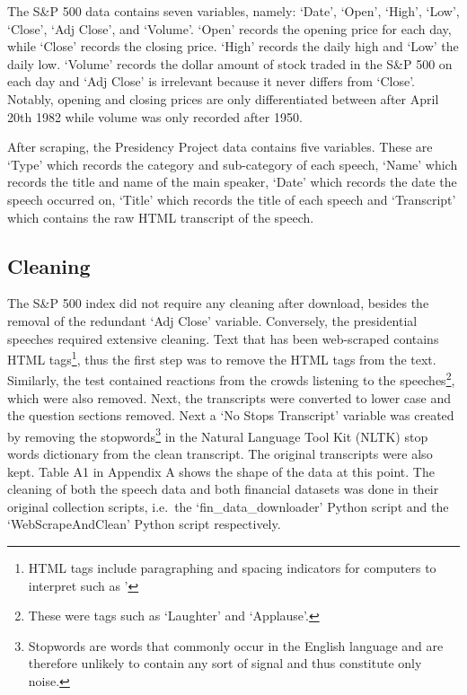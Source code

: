 \documentclass[11pt,preprint, authoryear]{elsarticle}
\numberwithin{equation}{section}
\numberwithin{figure}{section}
\numberwithin{table}{section}
\let\rmarkdownfootnote\footnote%
\def\footnote{\protect\rmarkdownfootnote}
\begin{document}
The S\&P 500 data contains seven variables, namely: `Date', `Open',
`High', `Low', `Close', `Adj Close', and `Volume'. `Open' records the
opening price for each day, while `Close' records the closing price.
`High' records the daily high and `Low' the daily low. `Volume' records
the dollar amount of stock traded in the S\&P 500 on each day and `Adj
Close' is irrelevant because it never differs from `Close'. Notably,
opening and closing prices are only differentiated between after April
20th 1982 while volume was only recorded after 1950.

After scraping, the Presidency Project data contains five variables.
These are `Type' which records the category and sub-category of each
speech, `Name' which records the title and name of the main speaker,
`Date' which records the date the speech occurred on, `Title' which
records the title of each speech and `Transcript' which contains the raw
HTML transcript of the speech.

\hypertarget{cleaning}{%
\subsection{Cleaning}\label{cleaning}}

The S\&P 500 index did not require any cleaning after download, besides
the removal of the redundant `Adj Close' variable. Conversely, the
presidential speeches required extensive cleaning. Text that has been
web-scraped contains HTML tags\footnote{HTML tags include paragraphing
  and spacing indicators for computers to interpret such as '}, thus the
first step was to remove the HTML tags from the text. Similarly, the
test contained reactions from the crowds listening to the
speeches\footnote{These were tags such as `Laughter' and `Applause'.},
which were also removed. Next, the transcripts were converted to lower
case and the question sections removed. Next a `No Stops Transcript'
variable was created by removing the stopwords\footnote{Stopwords are
  words that commonly occur in the English language and are therefore
  unlikely to contain any sort of signal and thus constitute only noise.}
in the Natural Language Tool Kit (NLTK) stop words dictionary from the
clean transcript. The original transcripts were also kept. Table A1 in
Appendix A shows the shape of the data at this point. The cleaning of
both the speech data and both financial datasets was done in their
original collection scripts, i.e.~the `fin\_data\_downloader' Python
script and the `WebScrapeAndClean' Python script respectively.
\end{document}
